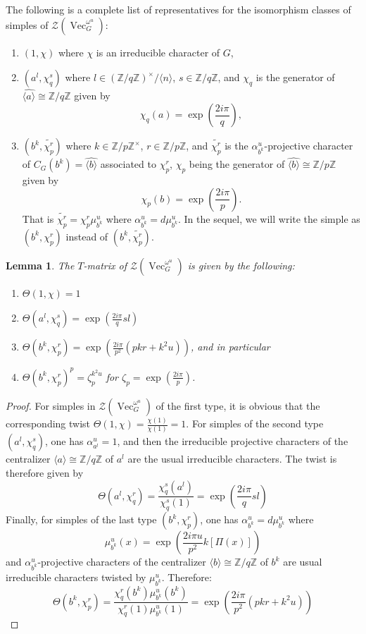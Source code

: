 \documentclass[a4paper, 10pt]{book}
\newtheorem{Lem}[theorem]{Lemma}
\theoremstyle{definition}
\numberwithin{equation}{chapter}
\newcommand\Vect{\operatorname{Vec}}
\newcommand\ZZ{\mathbb Z}
\newcommand\CTR{\mathcal Z}
\begin{document}
The following is a complete list of representatives for the isomorphism classes of simples of $\CTR(\Vect_G^{\omega^u})$:
\begin{enumerate}
\item
$(1,\chi)$ where $\chi$ is an irreducible character of $G$,
\item
$(a^l,\chi_q^s)$ where $l\in (\ZZ/q\ZZ)^\times/\langle n\rangle$, $s\in\ZZ/q\ZZ$,
and $\chi_q$ is the generator of $\widehat{\langle a \rangle}\cong \ZZ/q\ZZ$ given by
$$
\chi_q(a)=\exp\left(\frac{2i\pi}{q}\right),
$$ 
\item
$(b^k,\widetilde{\chi_p^r})$ where $k\in\ZZ/p\ZZ^\times$, $r\in \ZZ/p\ZZ$, and $\widetilde{\chi_p^r}$ is the $\alpha_{b^k}^u$-projective character of $C_G(b^k)=\widehat{\langle b \rangle}$ associated to $\chi_p^r$, $\chi_p$ being the generator of $\widehat{\langle b \rangle}\cong \ZZ/p\ZZ$ given by
$$
\chi_p(b)=\exp\left(\frac{2i\pi}{p}\right).
$$ 
That is $\widetilde{\chi_p^r}=\chi_p^r \mu_{b^k}^u$ where $\alpha_{b^k}^u=d \mu_{b^k}^u$. In the sequel, we will write the simple as $(b^k,\chi_p^r)$ instead of $(b^k,\widetilde{\chi_p^r})$.
\end{enumerate}
\begin{Lem}\label{TLem}
The $T$-matrix of $\CTR(\Vect_G^{\omega^u})$ is given by the following:
\begin{enumerate}
\item
$\Theta(1,\chi)=1$
\item
$\Theta(a^l,\chi_q^s)=\exp\left(\frac{2i\pi}{q}sl\right)$
\item
$\Theta(b^k,\chi_p^r)=\exp\left(\frac{2i\pi}{p^2}(pkr+k^2u)\right)$, and in particular
\item $\Theta(b^k,\chi_p^r)^p=\zeta_p^{k^2u}$ for $\zeta_p=\exp(\frac{2i\pi}{p})$.
\end{enumerate}
\end{Lem}
\begin{proof}
For simples in $\CTR(\Vect_G^{\omega^u})$ of the first type, it is obvious that the corresponding twist $\Theta(1,\chi)=\frac{\chi(1)}{\chi(1)}=1$. For simples of the second type $(a^l,\chi_q^s)$, one has $\alpha_{a^l}^u=1$, and then the irreducible projective characters of the centralizer $\langle a \rangle \cong \ZZ/q\ZZ$ of $a^l$ are the usual irreducible characters. The twist is therefore given by 
$$
\Theta(a^l,\chi_q^r)=\frac{\chi_q^s(a^l)}{\chi_q^s(1)}=\exp\left(\frac{2i\pi}{q}sl\right)
$$
Finally, for simples of the last type $(b^k,\chi_p^r)$, one has $\alpha_{b^k}^u=d \mu_{b^k}^u$ where
$$
\mu_{b^k}^u(x)=\exp\left(\frac{2i\pi u}{p^2}k[\Pi(x)]\right)
$$
and $\alpha_{b^k}^u$-projective characters of the centralizer $\langle b \rangle \cong \ZZ/q\ZZ$ of $b^k$ are usual irreducible characters twisted by $\mu_{b^k}^u$. Therefore:
$$
\Theta(b^k,\chi_p^r)=\frac{\chi_q^r(b^k)\mu_{b^k}^u(b^k)}{\chi_q^r(1)\mu_{b^k}^u(1)}=\exp\left(\frac{2i\pi}{p^2}(pkr+k^2u)\right)
$$
\end{proof}
\end{document}
